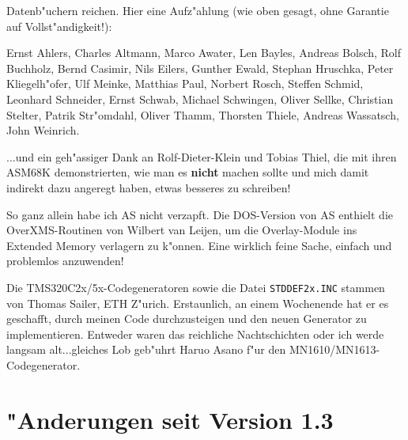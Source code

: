 \documentclass[12pt,a4paper,twoside]{report}
\newcommand{\bb}[1]{{\bf #1}}
\newcommand{\tty}[1]{{\tt #1}}
\begin{document}
Datenb"uchern reichen.  Hier eine Aufz"ahlung (wie oben gesagt, ohne
Garantie auf Vollst"andigkeit!):
\par
Ernst Ahlers, Charles Altmann, Marco Awater, Len Bayles, Andreas Bolsch,
Rolf Buchholz, Bernd Casimir, Nils Eilers, Gunther Ewald, Stephan Hruschka, Peter
Kliegelh"ofer, Ulf Meinke, Matthias Paul, Norbert Rosch, Steffen Schmid,
Leonhard Schneider, Ernst Schwab, Michael Schwingen, Oliver Sellke,
Christian Stelter, Patrik Str"omdahl, Oliver Thamm, Thorsten Thiele,
Andreas Wassatsch, John Weinrich.
\par
...und ein geh"assiger Dank an Rolf-Dieter-Klein und Tobias Thiel, die
mit ihren ASM68K demonstrierten, wie man es \bb{nicht} machen sollte und
mich damit indirekt dazu angeregt haben, etwas besseres zu schreiben!
\par
So ganz allein habe ich AS nicht verzapft.  Die DOS-Version von AS enthielt
die OverXMS-Routinen von Wilbert van Leijen, um die Overlay-Module ins
Extended Memory verlagern zu k"onnen.  Eine wirklich feine Sache,
einfach und problemlos anzuwenden!
\par
Die TMS320C2x/5x-Codegeneratoren sowie die Datei \tty{STDDEF2x.INC}
stammen von Thomas Sailer, ETH Z"urich.  Erstaunlich, an einem Wochenende
hat er es geschafft, durch meinen Code durchzusteigen und den neuen
Generator zu implementieren.  Entweder waren das reichliche Nachtschichten
oder ich werde langsam alt...gleiches Lob geb"uhrt Haruo Asano f"ur den
MN1610/MN1613-Codegenerator.


\cleardoublepage
\chapter{"Anderungen seit Version 1.3}
\end{document}
